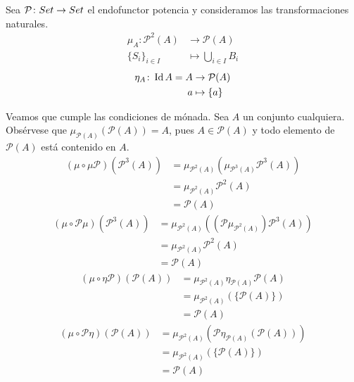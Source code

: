 \begin{example}
Sea $\mathcal{P} \colon {Set} \to {Set}$ el endofunctor potencia y consideramos las transformaciones naturales.
\begin{align*} \mu_A \colon \mathcal{P}^2(A) & \to \mathcal{P}(A)\\
\{S_i\}_{i \in I} & \mapsto \bigcup_{i \in I} B_i
\end{align*}
\begin{align*} \eta_A \colon \operatorname{Id} A = A & \to \mathcal{P}(A)\\
a & \mapsto \{a\}
\end{align*}

Veamos que cumple las condiciones de mónada. 
Sea $A$ un conjunto cualquiera.
Obsérvese que $\mu_{\mathcal{P}(A)}(\mathcal{P}(A)) = A$, pues $A \in \mathcal{P}(A)$ y todo elemento de $\mathcal{P}(A)$ está contenido en $A$.
\begin{align*}
(\mu \circ \mu \mathcal{P})(\mathcal{P}^3(A)) & = \mu_{\mathcal{P}^2(A)}\left(\mu_{\mathcal{P}^3(A)}\mathcal{P}^3(A)\right)\\
& = \mu_{\mathcal{P}^2(A)}\mathcal{P}^2(A)\\
& = \mathcal{P}(A)
\end{align*}
\begin{align*}
(\mu \circ \mathcal{P}\mu)(\mathcal{P}^3(A)) & = \mu_{\mathcal{P}^2(A)}\left((\mathcal{P}\mu_{\mathcal{P}^2(A)})\mathcal{P}^3(A)\right)\\
& = \mu_{\mathcal{P}^2(A)}\mathcal{P}^2(A)\\
& = \mathcal{P}(A)
\end{align*}
\begin{align*}
(\mu \circ \eta\mathcal{P})(\mathcal{P}(A)) & = \mu_{\mathcal{P}^2(A)}\eta_{\mathcal{P}(A)}\mathcal{P}(A)\\
& = \mu_{\mathcal{P}^2(A)}(\{\mathcal{P}(A)\})\\
& = \mathcal{P}(A)
\end{align*}
\begin{align*}
(\mu \circ \mathcal{P}\eta)(\mathcal{P}(A)) & = \mu_{\mathcal{P}^2(A)} \left(\mathcal{P}\eta_{\mathcal{P}(A)}(\mathcal{P}(A))\right)\\
& = \mu_{\mathcal{P}^2(A)} \left(\{\mathcal{P}(A)\}\right)\\
& = \mathcal{P}(A)
\end{align*}
\end{example}

